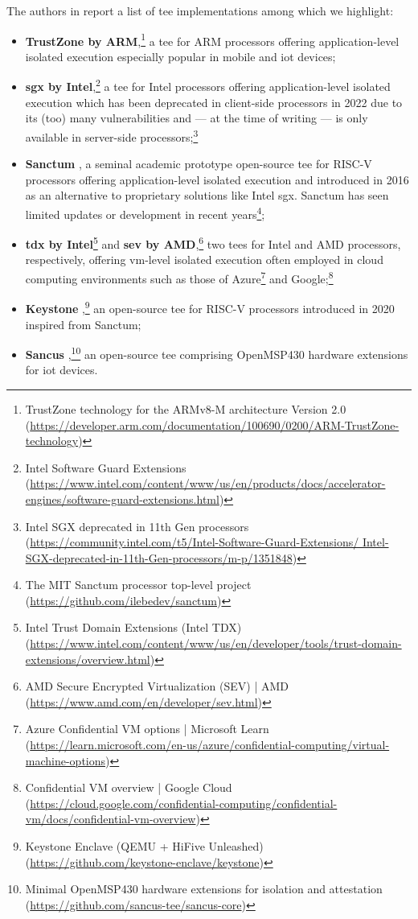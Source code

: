 The authors in \cite{munoz_survey_2023} report a list of \gls{tee} implementations among which we highlight:
\begin{itemize}
	\item \textbf{TrustZone by ARM},\footnote{TrustZone technology for the ARMv8-M architecture Version 2.0 (\url{https://developer.arm.com/documentation/100690/0200/ARM-TrustZone-technology})} a \gls{tee} for ARM processors offering application-level isolated execution especially popular in mobile and \gls{iot} devices;
	\item \textbf{\gls{sgx} by Intel},\footnote{Intel Software Guard Extensions (\url{https://www.intel.com/content/www/us/en/products/docs/accelerator-engines/software-guard-extensions.html})} a \gls{tee} for Intel processors offering application-level isolated execution which has been deprecated in client-side processors in 2022 due to its (too) many vulnerabilities and --- at the time of writing --- is only available in server-side processors;\footnote{Intel SGX deprecated in 11th Gen processors (\url{https://community.intel.com/t5/Intel-Software-Guard-Extensions/ Intel-SGX-deprecated-in-11th-Gen-processors/m-p/1351848})}
	\item \textbf{Sanctum} \cite{sanctum_costan_2016}, a seminal academic prototype open-source \gls{tee} for RISC-V processors offering application-level isolated execution and introduced in 2016 as an alternative to proprietary solutions like Intel \gls{sgx}. Sanctum has seen limited updates or development in recent years\footnote{The MIT Sanctum processor top-level project (\url{https://github.com/ilebedev/sanctum})};
	\item \textbf{\gls{tdx} by Intel}\footnote{Intel Trust Domain Extensions (Intel TDX)(\url{https://www.intel.com/content/www/us/en/developer/tools/trust-domain-extensions/overview.html})} and \textbf{\gls{sev} by AMD},\footnote{AMD Secure Encrypted Virtualization (SEV) | AMD (\url{https://www.amd.com/en/developer/sev.html})} two \glspl{tee} for Intel and AMD processors, respectively, offering \gls{vm}-level isolated execution often employed in cloud computing environments such as those of Azure\footnote{Azure Confidential VM options | Microsoft Learn (\url{https://learn.microsoft.com/en-us/azure/confidential-computing/virtual-machine-options})} and Google;\footnote{Confidential VM overview | Google Cloud (\url{https://cloud.google.com/confidential-computing/confidential-vm/docs/confidential-vm-overview})}
	\item \textbf{Keystone} \cite{lee_keystone_2020},\footnote{Keystone Enclave (QEMU + HiFive Unleashed) (\url{https://github.com/keystone-enclave/keystone})} an open-source \gls{tee} for RISC-V processors introduced in 2020 inspired from Sanctum;
	\item \textbf{Sancus} \cite{sancus_noorman_2013},\footnote{Minimal OpenMSP430 hardware extensions for isolation and attestation (\url{https://github.com/sancus-tee/sancus-core})} an open-source \gls{tee} comprising OpenMSP430 hardware extensions for \gls{iot} devices.
\end{itemize}

